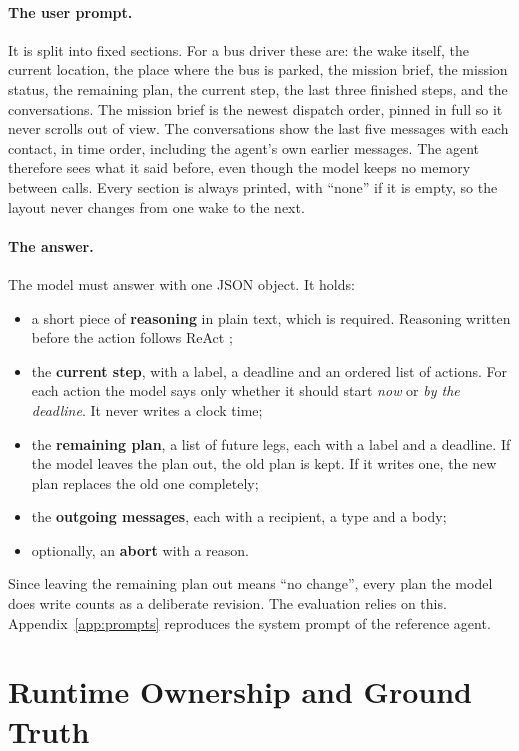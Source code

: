 \paragraph{The user prompt.} It is split into fixed sections. For a bus driver
these are: the wake itself, the current location, the place where the bus is
parked, the mission brief, the mission status, the remaining plan, the current
step, the last three finished steps, and the conversations. The mission brief is
the newest dispatch order, pinned in full so it never scrolls out of view. The
conversations show the last five messages with each contact, in time order,
including the agent's own earlier messages. The agent therefore sees what it
said before, even though the model keeps no memory between calls. Every section
is always printed, with ``none'' if it is empty, so the layout never changes
from one wake to the next.

\paragraph{The answer.} The model must answer with one JSON object. It holds:
\begin{itemize}
  \item a short piece of \textbf{reasoning} in plain text, which is required.
  Reasoning written before the action follows ReAct \parencite{yao2023};
  \item the \textbf{current step}, with a label, a deadline and an ordered
  list of actions. For each action the model says only whether it should start
  \emph{now} or \emph{by the deadline}. It never writes a clock time;
  \item the \textbf{remaining plan}, a list of future legs, each with a label
  and a deadline. If the model leaves the plan out, the old plan is kept. If it
  writes one, the new plan replaces the old one completely;
  \item the \textbf{outgoing messages}, each with a recipient, a type and a
  body;
  \item optionally, an \textbf{abort} with a reason.
\end{itemize}
Since leaving the remaining plan out means ``no change'', every plan the model
does write counts as a deliberate revision. The evaluation relies on this. Appendix~\ref{app:prompts} reproduces the system prompt of
the reference agent.

\section{Runtime Ownership and Ground Truth}
\label{sec:ag:runtime}

